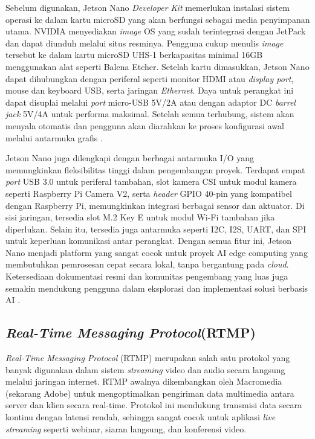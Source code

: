 Sebelum digunakan, Jetson Nano \emph{Developer Kit} memerlukan instalasi sistem operasi ke dalam kartu microSD yang akan berfungsi sebagai media penyimpanan utama. NVIDIA menyediakan \emph{image} OS yang sudah terintegrasi dengan JetPack dan dapat diunduh melalui situs resminya. Pengguna cukup menulis \emph{image} tersebut ke dalam kartu microSD UHS-1 berkapasitas minimal 16GB menggunakan alat seperti Balena Etcher. Setelah kartu dimasukkan, Jetson Nano dapat dihubungkan dengan periferal seperti monitor HDMI atau \emph{display port}, mouse dan keyboard USB, serta jaringan \emph{Ethernet}. Daya untuk perangkat ini dapat disuplai melalui \emph{port} micro-USB 5V/2A atau dengan adaptor DC \emph{barrel jack} 5V/4A untuk performa maksimal. Setelah semua terhubung, sistem akan menyala otomatis dan pengguna akan diarahkan ke proses konfigurasi awal melalui antarmuka grafis \cite{nvidia2020nano}.

Jetson Nano juga dilengkapi dengan berbagai antarmuka I/O yang memungkinkan fleksibilitas tinggi dalam pengembangan proyek. Terdapat empat \emph{port} USB 3.0 untuk periferal tambahan, slot kamera CSI untuk modul kamera seperti Raspberry Pi Camera V2, serta \emph{header} GPIO 40-pin yang kompatibel dengan Raspberry Pi, memungkinkan integrasi berbagai sensor dan aktuator. Di sisi jaringan, tersedia slot M.2 Key E untuk modul Wi-Fi tambahan jika diperlukan. Selain itu, tersedia juga antarmuka seperti I2C, I2S, UART, dan SPI untuk keperluan komunikasi antar perangkat. Dengan semua fitur ini, Jetson Nano menjadi platform yang sangat cocok untuk proyek AI edge computing yang membutuhkan pemrosesan cepat secara lokal, tanpa bergantung pada \emph{cloud}. Ketersediaan dokumentasi resmi dan komunitas pengembang yang luas juga semakin mendukung pengguna dalam eksplorasi dan implementasi solusi berbasis AI \cite{hanifah2022perbandingan}.


\subsection{\emph{Real-Time Messaging Protocol}(RTMP)}
\emph{Real-Time Messaging Protocol} (RTMP) merupakan salah satu protokol yang banyak digunakan dalam sistem \emph{streaming} video dan audio secara langsung melalui jaringan internet. RTMP awalnya dikembangkan oleh Macromedia (sekarang Adobe) untuk mengoptimalkan pengiriman data multimedia antara server dan klien secara real-time. Protokol ini mendukung transmisi data secara kontinu dengan latensi rendah, sehingga sangat cocok untuk aplikasi \emph{live streaming} seperti webinar, siaran langsung, dan konferensi video.

